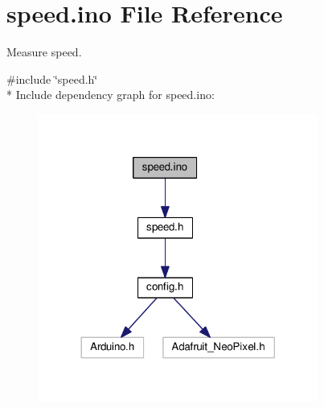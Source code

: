 \hypertarget{speed_8ino}{}\section{speed.\+ino File Reference}
\label{speed_8ino}


Measure speed.  


{\ttfamily \#include \char`\"{}speed.\+h\char`\"{}}\\*
Include dependency graph for speed.\+ino\+:\nopagebreak
\begin{figure}[H]
\begin{center}
\leavevmode
\includegraphics[width=260pt]{speed_8ino__incl}
\end{center}
\end{figure}
